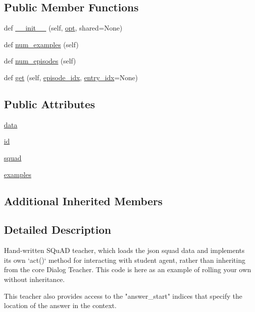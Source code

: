 \subsection*{Public Member Functions}
\begin{DoxyCompactItemize}
\item 
def \hyperlink{classparlai_1_1tasks_1_1squad2_1_1agents_1_1IndexTeacher_a11e053a7da91de71216a538505257ae2}{\+\_\+\+\_\+init\+\_\+\+\_\+} (self, \hyperlink{classparlai_1_1core_1_1agents_1_1Teacher_a3ce6243860ce978a897922863ed32fa4}{opt}, shared=None)
\item 
def \hyperlink{classparlai_1_1tasks_1_1squad2_1_1agents_1_1IndexTeacher_af85b15f1fe388fef825a5df688eac522}{num\+\_\+examples} (self)
\item 
def \hyperlink{classparlai_1_1tasks_1_1squad2_1_1agents_1_1IndexTeacher_aabf2ad3a489d5b1547afa2aaac7b5b79}{num\+\_\+episodes} (self)
\item 
def \hyperlink{classparlai_1_1tasks_1_1squad2_1_1agents_1_1IndexTeacher_a55e2945cb45316a80fc158e8f13eb0ac}{get} (self, \hyperlink{classparlai_1_1core_1_1teachers_1_1FixedDialogTeacher_afd4ebab8063eb42d182d30a1a41f133e}{episode\+\_\+idx}, \hyperlink{classparlai_1_1core_1_1teachers_1_1FixedDialogTeacher_ae3201b15f3c3b46a2f3511bad9b43e7d}{entry\+\_\+idx}=None)
\end{DoxyCompactItemize}
\subsection*{Public Attributes}
\begin{DoxyCompactItemize}
\item 
\hyperlink{classparlai_1_1tasks_1_1squad2_1_1agents_1_1IndexTeacher_abb04c653cc52c06137a52a47c68e02b3}{data}
\item 
\hyperlink{classparlai_1_1tasks_1_1squad2_1_1agents_1_1IndexTeacher_a8d371520b687f1035ce70e88c0ea4e91}{id}
\item 
\hyperlink{classparlai_1_1tasks_1_1squad2_1_1agents_1_1IndexTeacher_a6f328f6c5362d94d609cc8dad6da9fca}{squad}
\item 
\hyperlink{classparlai_1_1tasks_1_1squad2_1_1agents_1_1IndexTeacher_ae83acc001e0059480f6d8a57e260f95b}{examples}
\end{DoxyCompactItemize}
\subsection*{Additional Inherited Members}


\subsection{Detailed Description}
\begin{DoxyVerb}Hand-written SQuAD teacher, which loads the json squad data and
implements its own `act()` method for interacting with student agent,
rather than inheriting from the core Dialog Teacher. This code is here as
an example of rolling your own without inheritance.

This teacher also provides access to the "answer_start" indices that
specify the location of the answer in the context.
\end{DoxyVerb}
 

